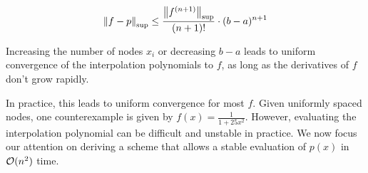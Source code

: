 \begin{corollary}
	\begin{align*}
		\norm{f - p}_{\sup} \leq \frac{\norm{f^{(n+1)}}_{\sup}}{(n+1)!} \cdot (b-a)^{n+1}
	\end{align*}
\end{corollary}
\begin{corollary}
	Increasing the number of nodes $x_i$ or decreasing $b-a$ leads to uniform convergence of the interpolation polynomials to $f$, as long as the derivatives of $f$ don't grow rapidly.
\end{corollary}
In practice, this leads to uniform convergence for most $f$. Given uniformly spaced nodes, one counterexample is given by  $f(x) = \frac{1}{1 + 25x^2}$.
\newpar
However, evaluating the interpolation polynomial can be difficult and unstable in practice. We now focus our attention on deriving a scheme that allows a stable evaluation of $p(x)$ in $\mathcal{O}(n^2)$ time.

